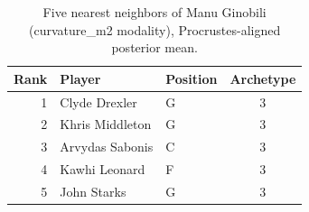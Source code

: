 \begin{table}[htbp]
  \centering\small
  \begin{tabular}{rllc}
    \toprule
    Rank & Player & Position & Archetype \\
    \midrule
    1 & Clyde Drexler & G & 3 \\
    2 & Khris Middleton & G & 3 \\
    3 & Arvydas Sabonis & C & 3 \\
    4 & Kawhi Leonard & F & 3 \\
    5 & John Starks & G & 3 \\
    \bottomrule
  \end{tabular}
  \caption{Five nearest neighbors of Manu Ginobili (curvature_m2 modality), Procrustes-aligned posterior mean.}
  \label{tab:Manu_Ginobili_neighbors_curvature_m2}
\end{table}

